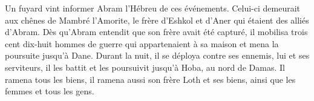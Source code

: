 Un fuyard vint informer Abram l’Hébreu de ces événements.
	Celui-ci demeurait aux chênes de Mambré l’Amorite,
	le frère d’Eshkol et d’Aner qui étaient des alliés d’Abram.
Dès qu’Abram entendit que son frère avait été capturé,
	il mobilisa trois cent dix-huit hommes de guerre qui appartenaient à sa maison
	et mena la poursuite jusqu’à Dane.
Durant la nuit, il se déploya contre ses ennemis, lui et ses serviteurs,
	il les battit et les poursuivit jusqu’à Hoba, au nord de Damas.
Il ramena tous les biens,
	il ramena aussi son frère Loth et ses biens, ainsi que les femmes et tous les gens.

